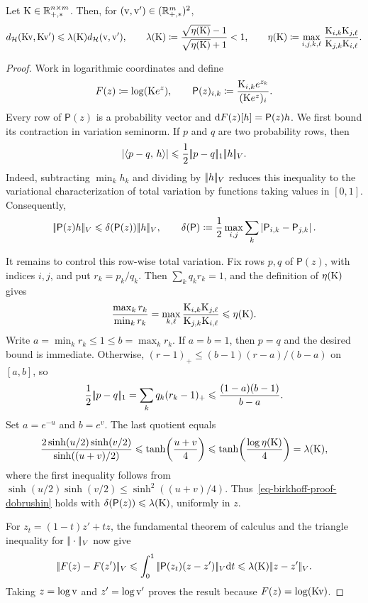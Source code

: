 \begin{thm}\label{thm-birkhoff}
	Let $\mathrm{K} \in \mathbb{R}_{+,*}^{n \times m}$. Then, for $(\mathrm{v},\mathrm{v}') \in (\mathbb{R}_{+,*}^m)^2$,
	\[
		d_{\mathcal{H}}(\mathrm{K} \mathrm{v},\mathrm{K} \mathrm{v}') \leqslant \lambda(\mathrm{K}) d_{\mathcal{H}}(\mathrm{v},\mathrm{v}'),
		\qquad
		\lambda(\mathrm{K}) \coloneqq \frac{\sqrt{\eta(\mathrm{K})}-1}{\sqrt{\eta(\mathrm{K})}+1}<1,
		\qquad
		\eta(\mathrm{K}) \coloneqq \underset{i,j,k,\ell}{\max}\;\frac{\mathrm{K}_{i,k}\mathrm{K}_{j,\ell}}{\mathrm{K}_{j,k}\mathrm{K}_{i,\ell}}.
	\]
\end{thm}
\begin{proof}
	Work in logarithmic coordinates and define
	\[
		F(z)\coloneqq\log(\mathrm{K} e^z),
		\qquad
		\mathsf P(z)_{i,k}
		\coloneqq
		\frac{\mathrm{K}_{i,k}e^{z_k}}{(\mathrm{K} e^z)_i}.
	\]
	Every row of $\mathsf P(z)$ is a probability vector and $\mathrm{d} F(z)[h]=\mathsf P(z)h$. We first bound its contraction in variation seminorm. If $p$ and $q$ are two probability rows, then
	\[
		\left\lvert\langle p-q,\,h\rangle\right\rvert
		\leqslant
		\frac12|\!| p-q |\!|_1|\!| h |\!|_V.
	\]
	Indeed, subtracting $\min_k h_k$ and dividing by $|\!| h |\!|_V$ reduces this inequality to the variational characterization of total variation by functions taking values in $[0,1]$. Consequently,
	\begin{equation}\label{eq-birkhoff-proof-dobrushin}
		|\!| \mathsf P(z)h |\!|_V
		\leqslant
		\delta(\mathsf P(z))|\!| h |\!|_V,
		\qquad
		\delta(\mathsf P)
		\coloneqq
		\frac12\max_{i,j}\sum_k\left\lvert\mathsf P_{i,k}-\mathsf P_{j,k}\right\rvert.
	\end{equation}

	It remains to control this row-wise total variation. Fix rows $p,q$ of $\mathsf P(z)$, with indices $i,j$, and put $r_k=p_k/q_k$. Then $\sum_kq_kr_k=1$, and the definition of $\eta(\mathrm{K})$ gives
	\[
		\frac{\max_k r_k}{\min_k r_k}
		=
		\max_{k,\ell}
		\frac{\mathrm{K}_{i,k}\mathrm{K}_{j,\ell}}{\mathrm{K}_{j,k}\mathrm{K}_{i,\ell}}
		\leqslant\eta(\mathrm{K}).
	\]
	Write $a=\min_k r_k\leq1\leq b=\max_k r_k$. If $a=b=1$, then $p=q$ and the desired bound is immediate. Otherwise, $(r-1)_+\leq (b-1)(r-a)/(b-a)$ on $[a,b]$, so
	\[
		\frac12|\!| p-q |\!|_1
		=
		\sum_kq_k(r_k-1)_+
		\leqslant
		\frac{(1-a)(b-1)}{b-a}.
	\]
	Set $a=e^{-u}$ and $b=e^v$. The last quotient equals
	\[
		\frac{2\sinh(u/2)\sinh(v/2)}{\sinh((u+v)/2)}
		\leqslant
		\tanh\!\left(\frac{u+v}{4}\right)
		\leqslant
		\tanh\!\left(\frac{\log\eta(\mathrm{K})}{4}\right)
		=
		\lambda(\mathrm{K}),
	\]
	where the first inequality follows from $\sinh(u/2)\sinh(v/2)\leq\sinh^2((u+v)/4)$. Thus~\eqref{eq-birkhoff-proof-dobrushin} holds with $\delta(\mathsf P(z))\leqslant\lambda(\mathrm{K})$, uniformly in $z$.

	For $z_t=(1-t)z'+tz$, the fundamental theorem of calculus and the triangle inequality for $|\!| \cdot |\!|_V$ now give
	\[
		|\!| F(z)-F(z') |\!|_V
		\leqslant
		\int_0^1|\!| \mathsf P(z_t)(z-z') |\!|_V\mathrm{d} t
		\leqslant
		\lambda(\mathrm{K})|\!| z-z' |\!|_V.
	\]
	Taking $z=\log\mathrm{v}$ and $z'=\log\mathrm{v}'$ proves the result because $F(z)=\log(\mathrm{K}\mathrm{v})$.
\end{proof}

